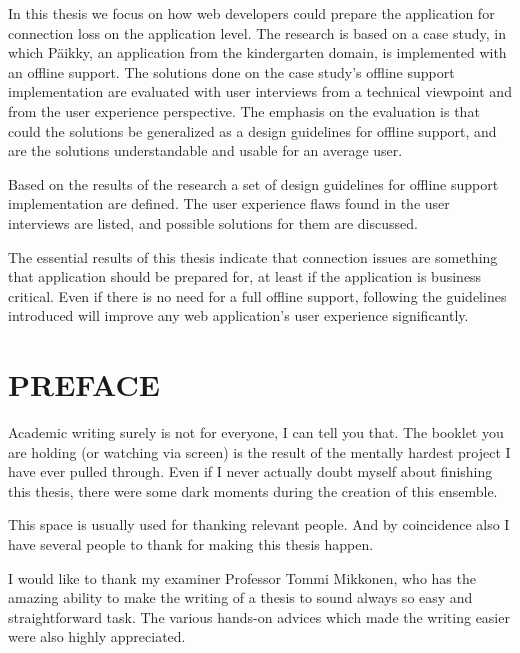 In this thesis we focus on how web developers could prepare the application for connection loss on the application level. The research is based on a case study, in which Päikky, an application from the kindergarten domain, is implemented with an offline support. The solutions done on the case study's offline support implementation are evaluated with user interviews from a technical viewpoint and from the user experience perspective. The emphasis on the evaluation is that could the solutions be generalized as a design guidelines for offline support, and are the solutions understandable and usable for an average user.

Based on the results of the research a set of design guidelines for offline support implementation are defined. The user experience flaws found in the user interviews are listed, and possible solutions for them are discussed.

The essential results of this thesis indicate that connection issues are something that application should be prepared for, at least if the application is business critical. Even if there is no need for a full offline support, following the guidelines introduced will improve any web application's user experience significantly.







\newpage
 
\chapter*{PREFACE}
\noindent 


Academic writing surely is not for everyone, I can tell you that. The booklet you are holding (or watching via screen) is the result of the mentally hardest project I have ever pulled through. Even if I never actually doubt myself about finishing this thesis, there were some dark moments during the creation of this ensemble. 

This space is usually used for thanking relevant people. And by coincidence also I have several people to thank for making this thesis happen.

I would like to thank my examiner Professor Tommi Mikkonen, who has the amazing ability to make the writing of a thesis to sound always so easy and straightforward task. The various hands-on advices which made the writing easier were also highly appreciated.

